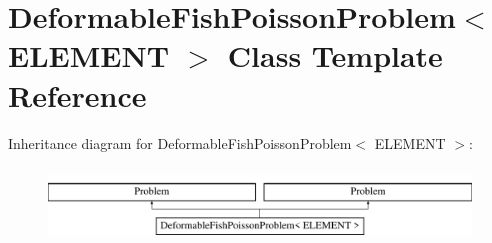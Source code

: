 \hypertarget{classDeformableFishPoissonProblem}{}\section{Deformable\+Fish\+Poisson\+Problem$<$ E\+L\+E\+M\+E\+NT $>$ Class Template Reference}
\label{classDeformableFishPoissonProblem}
Inheritance diagram for Deformable\+Fish\+Poisson\+Problem$<$ E\+L\+E\+M\+E\+NT $>$\+:\begin{figure}[H]
\begin{center}
\leavevmode
\includegraphics[height=1.992882cm]{classDeformableFishPoissonProblem}
\end{center}
\end{figure}
